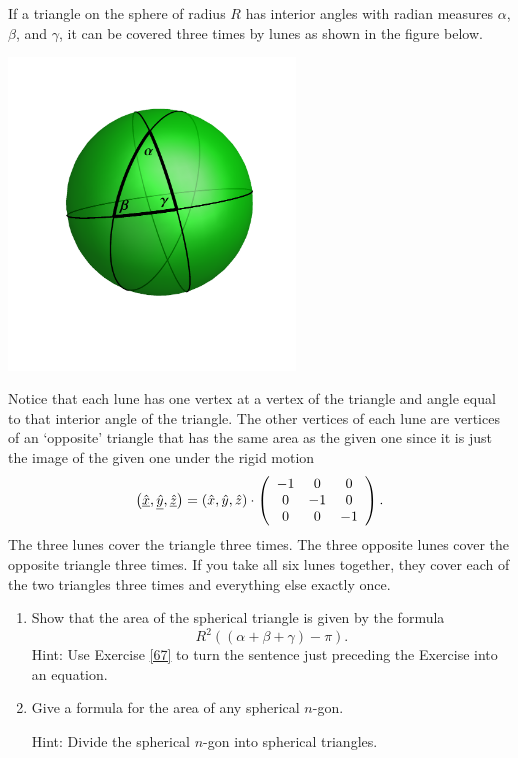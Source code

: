 If a triangle on the sphere of radius $R$ has interior angles with radian
measures $\alpha$, $\beta$, and $\gamma$, it can be covered three times by
lunes as shown in the figure below.%
\begin{image}
\includegraphics[width=3in]{W13_4.png}%
\end{image}
Notice that each lune has one vertex at a vertex of the triangle and angle
equal to that interior angle of the triangle. The other vertices of each lune
are vertices of an `opposite' triangle that has the same area as the given one
since it is just the image of the given one under the rigid motion%
\[
\left(  \underline{\hat{x}},\underline{\hat{y}},\underline{\hat{z}}\right)
=\left(  \hat{x},\hat{y},\hat{z}\right)  \cdot\left(
\begin{array}
[c]{ccc}%
-1 & 0 & 0\\
0 & -1 & 0\\
0 & 0 & -1
\end{array}
\right)  .
\]
The three lunes cover the triangle three times. The three opposite
lunes cover the opposite triangle three times. If you take all six
lunes together, they cover each of the two triangles three times and
everything else exactly once.

\begin{exercise}\hfil
\begin{enumerate}
\item Show that the area of the spherical triangle is given by the
formula%
\[
R^{2}\left(  \left(  \alpha+\beta+\gamma\right)  -\pi\right).
\]
Hint: Use Exercise \ref{67} to turn the sentence just preceding the Exercise
into an equation.

\item Give a formula for the area of any spherical $n$-gon.

Hint: Divide the spherical $n$-gon into spherical triangles.
\end{enumerate}
\end{exercise}
